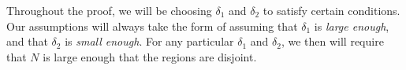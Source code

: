 Throughout the proof, we will be choosing $\delta_1$ and $\delta_2$ to satisfy
certain conditions.  Our assumptions will always take the form of assuming that
$\delta_1$ is \textit{large enough}, and that $\delta_2$ is \textit{small
enough}.  For any particular $\delta_1$ and $\delta_2$, we then will require
that $N$ is large enough that the regions are disjoint.

